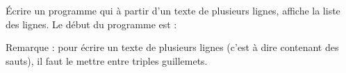 
\begin{exercice}\label{exoPremiere-0052}

    Écrire un programme qui à partir d'un texte de plusieurs lignes, affiche la liste des lignes. Le début du programme est :

    

    Remarque : pour écrire un texte de plusieurs lignes (c'est à dire contenant des sauts), il faut le mettre entre triples guillemets.

\end{exercice}
